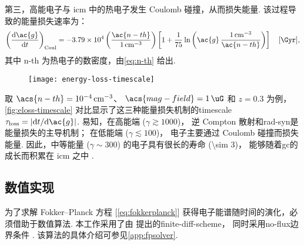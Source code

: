 第三，高能电子与 \ac{icm} 中的热电子发生 Coulomb 碰撞，从而损失能量.
该过程导致的能量损失速率为：
\begin{equation}
  \label{eq:eloss-coul}
  \left( \diff{\ac{g}}{t} \right)_{\R{Coul}} =
    \num{-3.79e4} \left( \frac{\ac{n-th}}{\SI{1}{\per\cm\cubed}} \right)
    \left[ 1 + \frac{1}{75} \ln \left(
        \ac{g}\,\frac{\SI{1}{\per\cm\cubed}}{\ac{n-th}} \right) \right]
    \quad [\si{\per\Gyr}] ,
\end{equation}
其中 \ac{n-th} 为热电子的数密度，由\autoref{eq:n-th} 给出.

\begin{figure}[htp]
  \centering
  \texttt{[image: energy-loss-timescale]}
  \label{fig:eloss-timescale}
\end{figure}

取 $\acs{n-th} = \SI{e-4}{\per\cubic\cm}$、
$\acs{mag-field} = \SI{1}{\uG}$ 和 $z = 0.3$ 为例，
\autoref{fig:eloss-timescale} 对比显示了这三种能量损失机制的\ac{timescale}
$\tau_{\R{loss}} = |\D{t}/\D{\ac{g}}|$.
易知，在高能端 ($\gamma \gtrsim 1000$)，
逆 Compton 散射和\ac{rad-syn}是能量损失的主导机制；
在低能端 ($\gamma \lesssim 100$)，
电子主要通过 Coulomb 碰撞而损失能量.
因此，中等能量 ($\gamma \sim 300$) 的电子具有很长的寿命 (\SI{\sim 3}{\Gyr})，
能够随着\ac{gc}的成长而积累在 \ac{icm} 之中 \cite{sarazin1999}.

\subsection{数值实现}
\label{sec:numerical}

为了求解 Fokker--Planck 方程 [\autoref{eq:fokkerplanck}]
获得电子能谱随时间的演化，必须借助于数值算法.
本工作采用了由  提出的\ac{finite-diff-scheme}，
同时采用\ac{no-flux}边界条件 \cite{park1996}.
该算法的具体介绍可参见\autoref{app:fpsolver}.

